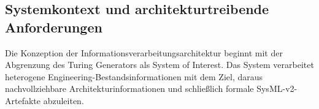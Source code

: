 %
%
%
%
%
%
%


\subsection{Systemkontext und architekturtreibende Anforderungen}
\label{sec:architektur_systemkontext}
Die Konzeption der Informationsverarbeitungsarchitektur beginnt mit der
Abgrenzung des Turing Generators als System of Interest. Das System verarbeitet
heterogene Engineering-Bestandsinformationen mit dem Ziel, daraus
nachvollziehbare Architekturinformationen und schließlich formale
SysML-v2-Artefakte abzuleiten.

